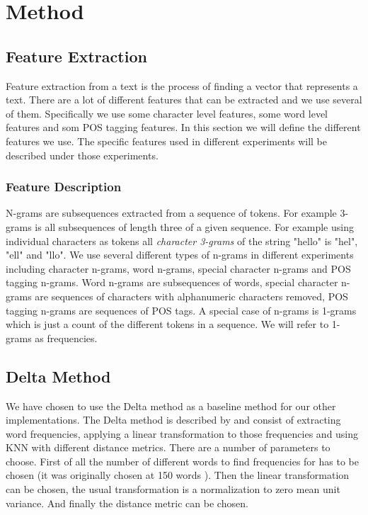 \section{Method}

\subsection{Feature Extraction}
Feature extraction from a text is the process of finding a vector that
represents a text. There are a lot of different features that can be extracted
and we use several of them. Specifically we use some character level features,
some word level features and som \gls{POS} tagging features. In this section
we will define the different features we use. The specific features used in
different experiments will be described under those experiments.

\subsubsection{Feature Description}
N-grams are subsequences extracted from a sequence of tokens. For example
3-grams is all subsequences of length three of a given sequence. For example
using individual characters as tokens all \textit{character 3-grams} of the
string "hello" is "hel", "ell" and "llo". We use several different types of
n-grams in different experiments including character n-grams, word n-grams,
special character n-grams and \gls{POS} tagging n-grams. Word n-grams are
subsequences of words, special character n-grams are sequences of characters
with alphanumeric characters removed, \gls{POS} tagging n-grams are sequences of
\gls{POS} tags. A special case of n-grams is 1-grams which is just a count of
the different tokens in a sequence. We will refer to 1-grams as frequencies.

\subsection{Delta Method}
We have chosen to use the Delta method as a baseline method for our other
implementations. The Delta method is described by \cite{evert2015towards} and
consist of extracting word frequencies, applying a linear transformation to
those frequencies and using \gls{KNN} with different distance metrics. There are
a number of parameters to choose. First of all the number of different words to
find frequencies for has to be chosen (it was originally chosen at 150 words
\cite{evert2015towards}). Then the linear transformation can be chosen, the
usual transformation is a normalization to zero mean unit variance. And finally
the distance metric can be chosen.

